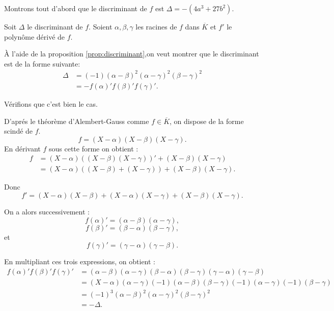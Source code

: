 \begin{demonstration}
    Montrons tout d'abord que le discriminant de $f$ est $\Delta= -(4a^3 + 27b^2)$.

    Soit $\Delta$ le discriminant de $f$. Soient $\alpha, \beta, \gamma $ les racines de $f$ dans $\overline{K}$ et $f'$ le polynôme dérivé de $f$.

    À l'aide de la proposition \ref{prop:discriminant},on veut montrer que le discriminant est de la forme
    suivante: 
    \begin{align*}
        \Delta &= (-1) ( \alpha - \beta )^2 ( \alpha - \gamma )^2 ( \beta - \gamma )^2 \\
          &= - f(\alpha)'f(\beta )'f(\gamma)'
    .\end{align*}

    Vérifions que c'est bien le cas.

    D'aprés le théorème d'Alembert-Gauss comme $f \in \overline{K}$, on dispose de la
    forme scindé de $f$.
    \[
        f = \left( X - \alpha \right) \left( X - \beta \right) \left( X - \gamma \right) 
    .\] 
    En dérivant $f$ sous cette forme on obtient :
    \begin{align*}
        f &= ( X - \alpha ) \left( ( X - \beta ) ( X - \gamma ) \right)'  + ( X - \beta ) ( X - \gamma )\\
          &= ( X - \alpha ) \left( ( X - \beta ) + ( X - \gamma ) \right) + ( X - \beta ) ( X - \gamma ) 
    .\end{align*}

    Donc  
\[
f' = ( X - \alpha ) ( X - \beta ) + ( X - \alpha ) ( X - \gamma ) + ( X - \beta ) ( X - \gamma )
.\] 

On a alors successivement : 
\[
    f(\alpha)' = ( \alpha - \beta) ( \alpha - \gamma )
,\] 
\[
f(\beta )' = ( \beta - \alpha) ( \beta - \gamma)
,\] 
et
\[
f(\gamma)' = ( \gamma - \alpha) ( \gamma - \beta)
.\] 

En multipliant ces trois expressions, on obtient :
\begin{align*}
    f(\alpha)' f(\beta )' f(\gamma)' &= ( \alpha - \beta ) ( \alpha - \gamma ) ( \beta - \alpha ) ( \beta - \gamma) ( \gamma - \alpha ) ( \gamma - \beta ) \\
&= \left( X - \alpha \right) \left( \alpha - \gamma \right) \left( -1 \right) \left( \alpha - \beta  \right) \left( \beta - \gamma \right) \left( -1 \right) \left( \alpha - \gamma \right) \left( -1 \right) \left( \beta - \gamma \right) \\
&= \left( -1 \right) ^3 \left( \alpha - \beta  \right) ^2 \left( \alpha - \gamma  \right) ^2 \left( \beta - \gamma \right) ^2\\
 &= - \Delta
.\end{align*}


\end{demonstration}
